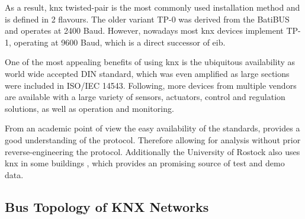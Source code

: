 As a result, \gls{knx} twisted-pair is the most commonly used installation method and is defined in 2 flavours. \parencite{DIN_EN_50090-5-2}
The older variant TP-0 was derived from the BatiBUS  and operates at 2400 Baud. However, nowadays most \gls{knx} devices implement TP-1, operating at 9600 Baud, which is a direct successor of \gls{eib}.

One of the most appealing benefits of using \gls{knx} is the ubiquitous availability as world wide accepted DIN standard, which was even amplified as large sections were included in ISO/IEC 14543.
Following, more devices from multiple vendors are available with a large variety of sensors, actuators, control and regulation solutions, as well as operation and monitoring.

From an academic point of view the easy availability of the standards, provides a good understanding of the protocol. Therefore allowing for analysis without prior reverse-engineering the protocol.
Additionally the University of Rostock also uses \gls{knx} in some buildings , which provides an promising source of test and demo data.

\subsection{Bus Topology of KNX Networks}
\label{sec:background:bas:knx:topo}

